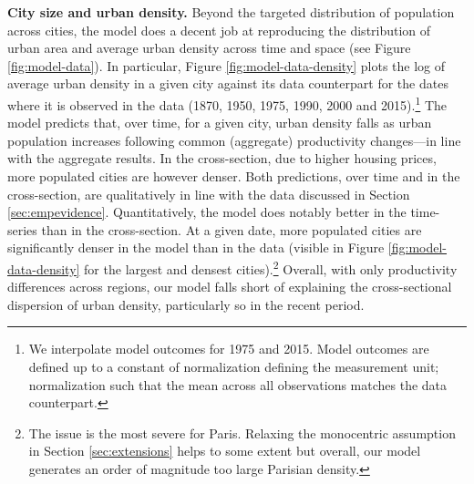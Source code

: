 \documentclass[./20250130-paper.tex]{subfiles}
\begin{document}
\noindent \textbf{City size and urban density.} Beyond the targeted distribution of population across cities, the model does a decent job at reproducing the distribution of urban area and average urban density across time and space (see Figure \ref{fig:model-data}). In particular, Figure \ref{fig:model-data-density} plots the log of average urban density in a given city against its data counterpart for the dates where it is observed in the data (1870, 1950, 1975, 1990, 2000 and 2015).\footnote{We interpolate model outcomes for 1975 and 2015. Model outcomes are defined up to a constant of normalization defining the measurement unit; normalization such that the mean across all observations matches the data counterpart.} The model predicts that, over time, for a given city, urban density falls as urban population increases following common (aggregate) productivity changes---in line with the aggregate results. In the cross-section, due to higher housing prices, more populated cities are however denser. Both predictions, over time and in the cross-section, are qualitatively in line with the data discussed in Section \ref{sec:empevidence}. Quantitatively, the model does notably better in the time-series than in the cross-section. At a given date, more populated cities are significantly denser in the model than in the data (visible in Figure \ref{fig:model-data-density} for the largest and densest cities).\footnote{The issue is the most severe for Paris. Relaxing the monocentric assumption in Section \ref{sec:extensions} helps to some extent but overall, our model generates an order of magnitude too large Parisian density.} Overall, with only productivity differences across regions, our model falls short of explaining the cross-sectional dispersion of urban density, particularly so in the recent period.
\end{document}

